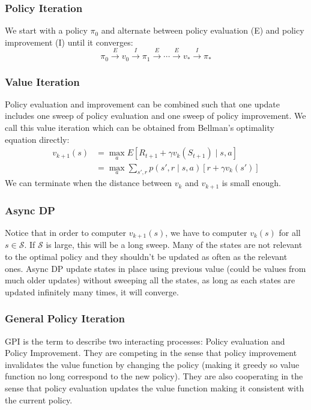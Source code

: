 \documentclass[twocolumn, 10pt]{article}
\newcommand{\stateset}{\mathcal{S}}
\begin{document}
	\subsubsection*{Policy Iteration}
	We start with a policy $\pi_0$ and alternate between policy evaluation (E) and policy improvement (I) until it converges:
	$$ \pi_0 \overset{E}{\rightarrow} v_0 \overset{I}{\rightarrow} \pi_1 \overset{E}{\rightarrow} \cdots \overset{E}{\rightarrow} v_* \overset{I}{\rightarrow} \pi_* $$
	
	\subsubsection*{Value Iteration}
	Policy evaluation and improvement can  be combined such that one update includes one sweep of policy evaluation and one sweep of policy improvement. We call this value iteration which can be obtained from Bellman's optimality equation directly:
	$$
	\begin{aligned}
	v_{k+1}(s) &= \max_{a} E[R_{t+1} + \gamma v_{k}(S_{t+1}) \mid s, a] \\
	&= \max_{a} \sum_{s' , r} p(s', r \mid s, a) [r + \gamma v_{k}(s')]
	\end{aligned}
	$$
	We can terminate when the distance between $v_k$ and $v_{k+1}$ is small enough.
	
	\subsubsection*{Async DP}
	Notice that in order to computer $v_{k+1}(s)$, we have to computer $v_k(s)$ for all $s \in \stateset$. If $\stateset$ is large, this will be a long sweep. Many of the states are not relevant to the optimal policy and they shouldn't be updated as often as the relevant ones. Async DP update states in place using previous value (could be values from much older updates) without sweeping all the states, as long as each states are updated infinitely many times, it will converge. 
	
	\subsubsection*{General Policy Iteration}
	GPI is the term to describe two interacting processes: Policy evaluation and Policy Improvement. They are competing in the sense that policy improvement invalidates the value function by changing the policy (making it greedy so value function no long correspond to the new policy). They are also cooperating in the sense that policy evaluation updates the value function making it consistent with the current policy.
	
\end{document}
